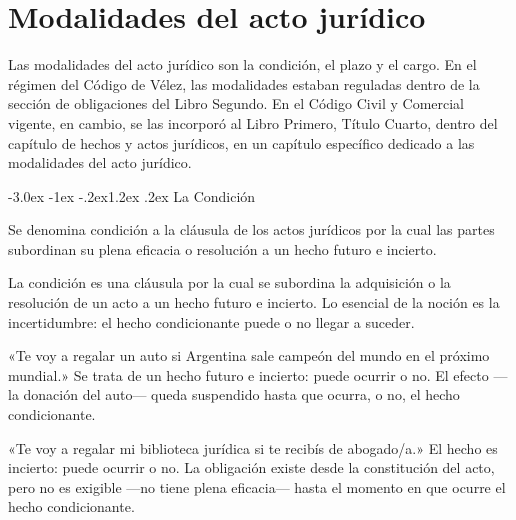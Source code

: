 \documentclass[12pt,oneside]{book}
\makeatletter
\renewcommand\section{\@startsection{section}{1}{\z@}%
  {-3.0ex \@plus -1ex \@minus -.2ex}{1.2ex \@plus .2ex}%
  {\normalfont\large\bfseries\color{acento}}}
\makeatother
\begin{document}

\chapter{Modalidades del acto jurídico}
\label{ch:modalidades}

Las modalidades del acto jurídico son la condición, el plazo y el cargo. En el régimen del Código de Vélez, las modalidades estaban reguladas dentro de la sección de obligaciones del Libro Segundo. En el Código Civil y Comercial vigente, en cambio, se las incorporó al Libro Primero, Título Cuarto, dentro del capítulo de hechos y actos jurídicos, en un capítulo específico dedicado a las modalidades del acto jurídico.

\section{La Condición}

\begin{regla}
Se denomina condición a la cláusula de los actos jurídicos por la cual las partes subordinan su plena eficacia o resolución a un hecho futuro e incierto.
\end{regla}

\begin{definicion}[{Condición}]
La condición es una cláusula por la cual se subordina la adquisición o la resolución de un acto a un hecho futuro e incierto. Lo esencial de la noción es la incertidumbre: el hecho condicionante puede o no llegar a suceder.
\end{definicion}

\begin{ejemplo}
«Te voy a regalar un auto si Argentina sale campeón del mundo en el próximo mundial.» Se trata de un hecho futuro e incierto: puede ocurrir o no. El efecto ---la donación del auto--- queda suspendido hasta que ocurra, o no, el hecho condicionante.
\end{ejemplo}

\begin{ejemplo}
«Te voy a regalar mi biblioteca jurídica si te recibís de abogado/a.» El hecho es incierto: puede ocurrir o no. La obligación existe desde la constitución del acto, pero no es exigible ---no tiene plena eficacia--- hasta el momento en que ocurre el hecho condicionante.
\end{ejemplo}
\end{document}
